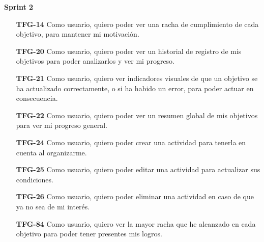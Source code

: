 \documentclass[10pt, a4paper]{aqademic}
\begin{document}
\textbf{Sprint 2}
\begin{itemize}[leftmargin=16mm]
	\item [\textbf{TFG-14}] Como usuario, quiero poder ver una racha de cumplimiento de cada objetivo, para mantener mi motivación.

	\item [\textbf{TFG-20}] Como usuario, quiero poder ver un historial de registro de mis objetivos para poder analizarlos y ver mi progreso.
	
	\item [\textbf{TFG-21}] Como usuario, quiero ver indicadores visuales de que un objetivo se ha actualizado correctamente, o si ha habido un error, para poder actuar en consecuencia.
	
	\item [\textbf{TFG-22}] Como usuario, quiero poder ver un resumen global de mis objetivos para ver mi progreso general.
	
	\item [\textbf{TFG-24}] Como usuario, quiero poder crear una actividad para tenerla en cuenta al organizarme.
	
	\item [\textbf{TFG-25}] Como usuario, quiero poder editar una actividad para actualizar sus condiciones.
	
	\item [\textbf{TFG-26}] Como usuario, quiero poder eliminar una actividad en caso de que ya no sea de mi interés.
	
	\item [\textbf{TFG-84}] Como usuario, quiero ver la mayor racha que he alcanzado en cada objetivo para poder tener presentes mis logros.
\end{itemize}
\end{document}
